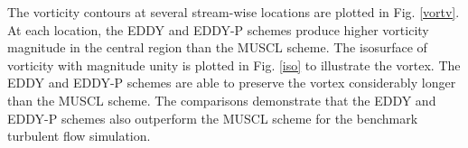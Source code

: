 The vorticity contours at several stream-wise locations are plotted in Fig. \ref{vortv}. At each location, the EDDY and EDDY-P schemes produce higher vorticity magnitude in the central region than the MUSCL scheme. The isosurface of vorticity with magnitude unity is plotted in Fig. \ref{iso} to illustrate the vortex. The EDDY and EDDY-P schemes are able to preserve the vortex considerably longer than the MUSCL scheme. The comparisons demonstrate that the EDDY and EDDY-P schemes also outperform the MUSCL scheme for the benchmark turbulent flow simulation.
\begin{figure}[t]  
\centering

\end{figure}
